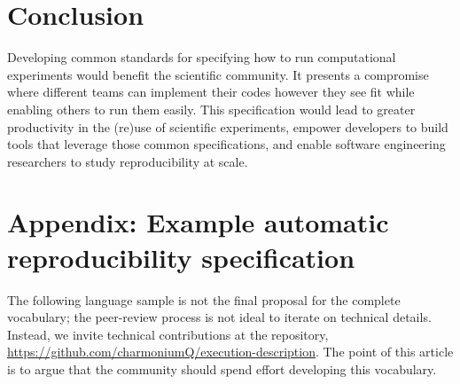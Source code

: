 \documentclass[manuscript]{acmart}
\begin{document}
\hypertarget{conclusion}{%
\section{Conclusion}\label{conclusion}}

Developing common standards for specifying how to run computational
experiments would benefit the scientific community. It presents a
compromise where different teams can implement their codes however they
see fit while enabling others to run them easily. This specification
would lead to greater productivity in the (re)use of scientific
experiments, empower developers to build tools that leverage those
common specifications, and enable software engineering researchers to
study reproducibility at scale.

\eject

\hypertarget{appendix-example-automatic-reproducibility-specification}{%
\section{Appendix: Example automatic reproducibility
specification}\label{appendix-example-automatic-reproducibility-specification}}

The following language sample is not the final proposal for the complete
vocabulary; the peer-review process is not ideal to iterate on technical
details. Instead, we invite technical contributions at the repository,
\url{https://github.com/charmoniumQ/execution-description}. The point of
this article is to argue that the community should spend effort
developing this vocabulary.

\small
\end{document}
